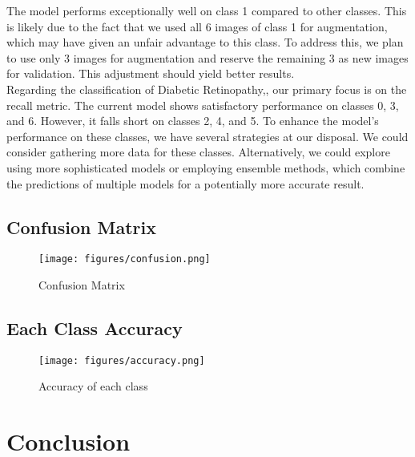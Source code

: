\documentclass[conference]{IEEEtran}
\begin{document}
The model performs exceptionally well on class 1 compared to other classes. This is likely due to the fact that we used all 6 images of class 1 for augmentation, which may have given an unfair advantage to this class. To address this, we plan to use only 3 images for augmentation and reserve the remaining 3 as new images for validation. This adjustment should yield better results. \\

Regarding the classification of Diabetic Retinopathy,, our primary focus is on the recall metric. The current model shows satisfactory performance on classes 0, 3, and 6. However, it falls short on classes 2, 4, and 5. To enhance the model’s performance on these classes, we have several strategies at our disposal. We could consider gathering more data for these classes. Alternatively, we could explore using more sophisticated models or employing ensemble methods, which combine the predictions of multiple models for a potentially more accurate result. \\

\subsection{Confusion Matrix}

\begin{figure}[h]
\centering
\texttt{[image: figures/confusion.png]}
\caption{Confusion Matrix}
\label{fig:confusion_matrix}
\end{figure}

\subsection{Each Class Accuracy}

\begin{figure}[h]
\centering
\texttt{[image: figures/accuracy.png]}
\caption{Accuracy of each class}
\label{fig:accuracy}
\end{figure}

\section{\textbf{Conclusion}}
\end{document}
